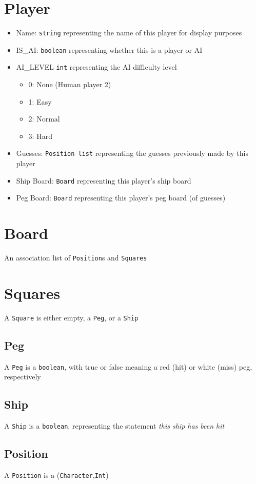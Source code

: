 \documentclass[10pt]{article}
\begin{document}
\section*{Player}
\begin{itemize}
    \item Name: \texttt{string} representing the name of this player for display purposes
    \item IS\_AI: \texttt{boolean} representing whether this is a player or AI
    \item AI\_LEVEL \texttt{int} representing the AI difficulty level
        \begin{itemize}
            \item 0: None (Human player 2)
            \item 1: Easy
            \item 2: Normal
            \item 3: Hard
        \end{itemize}
    \item Guesses: \texttt{Position list} representing the guesses previously made by this player
    \item Ship Board: \texttt{Board} representing this player's ship board
    \item Peg Board: \texttt{Board} representing this player's peg board (of guesses)
\end{itemize}
\section*{Board}
An association list of \texttt{Position}s and \texttt{Squares}
\section*{Squares}
A \texttt{Square} is either empty, a \texttt{Peg}, or a \texttt{Ship}
\subsection*{Peg}
A \texttt{Peg} is a \texttt{boolean}, with true or false meaning a red (hit) or white (miss) peg, respectively
\subsection*{Ship}
A \texttt{Ship} is a \texttt{boolean}, representing the statement \textit{this ship has been hit}
\subsection*{Position}
A \texttt{Position} is a (\texttt{Character},\texttt{Int})
\end{document}
